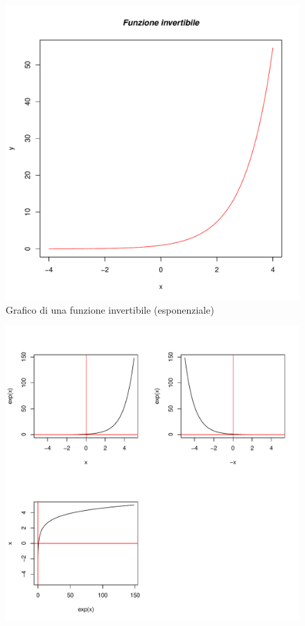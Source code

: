 \documentclass[onecolumn,11pt]{book}\usepackage[]{graphicx}\usepackage[]{color}
\makeatletter
\def\maxwidth{ %
  \ifdim\Gin@nat@width>\linewidth
    \linewidth
  \else
    \Gin@nat@width
  \fi
}
\newenvironment{knitrout}{}{} %
\makeatother
\begin{document}
\begin{figure}
\begin{knitrout}
\color{fgcolor}
\includegraphics[width=\maxwidth]{figure/unnamed-chunk-96-1} 

\end{knitrout}
\caption{Grafico di una funzione invertibile (esponenziale)}
\label{fig::funzionestart}
\end{figure}
\begin{figure}

\begin{knitrout}
\color{fgcolor}
\includegraphics[width=\maxwidth]{figure/unnamed-chunk-97-1} 

\end{knitrout}
\end{figure}
\end{document}
